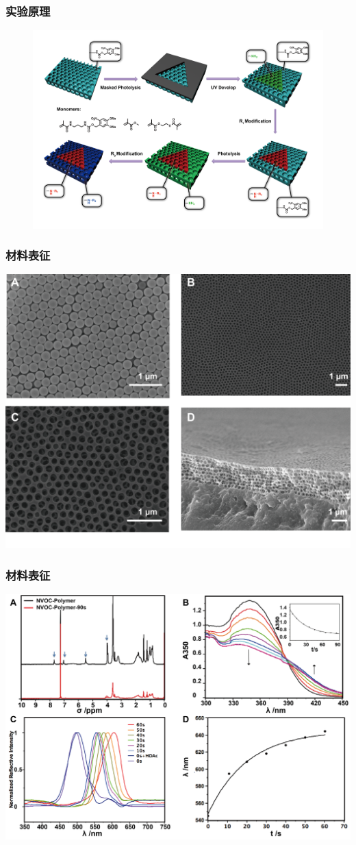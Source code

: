 \documentclass{beamer}
\begin{document}
\begin{frame}
  \frametitle{实验原理}
  \begin{figure}[htbp]
    \centering
    \includegraphics[width=0.9\linewidth]{figures/scheme-2D.png}
  \end{figure}
\end{frame}


\begin{frame}
\frametitle{材料表征}
    \centering
    \includegraphics[width=0.85\linewidth]{figures/SEM-ch3.png}
\end{frame}

\begin{frame}
  \frametitle{材料表征}
  \centering
  \includegraphics[width=0.9\linewidth]{figures/ch3-characterization.png}
\end{frame}
\end{document}
